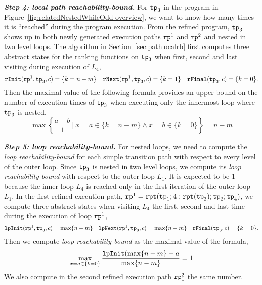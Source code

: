 \textbf{\emph{Step 4: local path reachability-bound.}}
For $\mathtt{tp}_3$ in the program in Figure~\ref{fig:relatedNestedWhileOdd-overview}, we want to know how many times it is ``reached'' during the program execution.
From the refined program, $\mathtt{tp}_3$ shows up in both newly generated execution paths $\mathtt{rp}^1$ and $\mathtt{rp}^2$  and nested in two level loops.
The algorithm in Section~\ref{sec:pathlocalrb} first
computes three abstract states for the ranking functions on $\mathtt{tp}_3$ when first, second and last visiting during execution of $L_4$,
\begin{equation*}
    \mathtt{rInit}(\mathtt{rp}^1, \mathtt{tp}_3, c) = \{k = n - m\} \quad
    \mathtt{rNext}(\mathtt{rp}^1, \mathtt{tp}_3, c) = \{k = 1\} \quad
    \mathtt{rFinal}(\mathtt{tp}_3, c) = \{ k = 0 \}.
\end{equation*}
Then  the maximal value of the following formula provides   
an upper bound on the number of execution times of $\mathtt{tp}_3$ when executing only the innermost loop where $\mathtt{tp}_3$ is nested. 
\[
    \max
    \left\{ 
        {\frac{a - b}{1}} 
        ~\vert~
        x = a \in \{k = n - m\}
        \land x = b \in \{ k = 0 \}
    \right\}  = n - m
\]

\textbf{\emph{Step 5: loop reachability-bound.}}
For nested loops, we need to compute the \emph{loop reachability-bound} for each simple transition path with respect to every level of the outer loop.
Since $\mathtt{tp}_3$ is nested in two level loops, we compute its \emph{loop reachability-bound}
with respect to the outer loop $L_1$. 
It is expected to be $1$ because the inner loop $L_4$ is reached only in the first iteration of the outer loop $L_1$.
In the first refined execution path, $\mathtt{rp}^1 = \mathtt{rpt}(\mathtt{tp}_1; 4:\mathtt{rpt}(\mathtt{tp}_3); \mathtt{tp}_2; \mathtt{tp}_4)$,
we compute three abstract states when visiting $L_4$ the first, second and last time during the execution of loop $\mathtt{rp}^1$,
\begin{equation*}
\mathtt{lpInit}(\mathtt{rp}^1, \mathtt{tp}_3, c) = \max\{ n - m\} \quad
\mathtt{lpNext}(\mathtt{rp}^1, \mathtt{tp}_3, c) = \max\{n - m\} \quad
\mathtt{rFinal}(\mathtt{tp}_3, c) = \{k = 0\}.
\end{equation*}
Then we compute \emph{loop reachability-bound} as the maximal value of the formula,
\[
    \max\limits_{x = a \in \{k = 0\}}
    \frac{\mathtt{lpInit}(\max\{n - m\} - a }{\max\{n - m\}} = 1
  \]
We also compute in the second refined execution path $\mathtt{rp}_1^2$ the same number.

